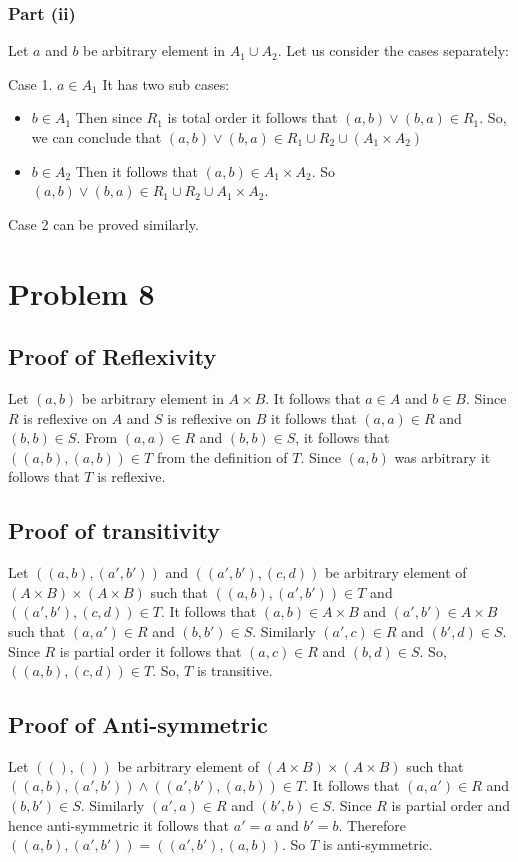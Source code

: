 \documentclass{article}
\begin{document}
\subsubsection{Part (ii)}
Let $a$ and $b$ be arbitrary element in $A_1 \cup A_2$. Let us
consider the cases separately:

Case 1. $a \in A_1$ It has two sub cases:
\begin{itemize}
\item $b \in A_1$ Then since $R_1$ is total order it follows that
  $(a,b) \lor (b,a) \in R_1$. So, we can conclude that $(a,b) \lor
  (b,a) \in R_1 \cup R_2 \cup (A_1 \times A_2)$
\item $b \in A_2$ Then it follows that $(a,b) \in A_1 \times A_2$. So
  $(a,b) \lor (b,a) \in R_1 \cup R_2 \cup A_1 \times A_2$.
\end{itemize}

Case 2 can be proved similarly.

\section{Problem 8}
\subsection{Proof of Reflexivity}
Let $(a,b)$ be arbitrary element in $A \times B$. It follows that $a
\in A$ and $b \in B$. Since $R$ is reflexive on $A$ and $S$ is
reflexive on $B$ it follows that $(a,a) \in R$ and $(b,b) \in S$. From
$(a,a) \in R$ and $(b,b) \in S$, it follows that $((a,b),(a,b)) \in T$
from the definition of $T$. Since $(a,b)$ was arbitrary it follows
that $T$ is reflexive.

\subsection{Proof of transitivity}
Let $((a,b),(a',b'))$ and $((a',b'),(c,d))$ be arbitrary element of
$(A \times B) \times (A \times B)$ such that $((a,b),(a',b')) \in T$
and $((a',b'),(c,d)) \in T$. It follows that $(a,b) \in A \times B$
and $(a',b') \in A \times B$ such that $(a,a') \in R$ and $(b,b') \in
S$. Similarly $(a',c) \in R$ and $(b',d) \in S$. Since $R$ is partial
order it follows that $(a,c) \in R$ and $(b,d) \in S$. So,
$((a,b),(c,d)) \in T$. So, $T$ is transitive.

\subsection{Proof of Anti-symmetric}
Let $((),())$ be arbitrary element of $(A \times B) \times (A \times
B)$ such that $((a,b),(a',b')) \land ((a',b'),(a,b)) \in T$. It
follows that $(a,a') \in R$ and $(b,b') \in S$. Similarly $(a',a) \in
R$ and $(b',b) \in S$. Since $R$ is partial order and hence
anti-symmetric it follows that $a' = a$ and $b' = b$. Therefore
$((a,b),(a',b')) = ((a',b'),(a,b))$. So $T$ is anti-symmetric.
\end{document}

